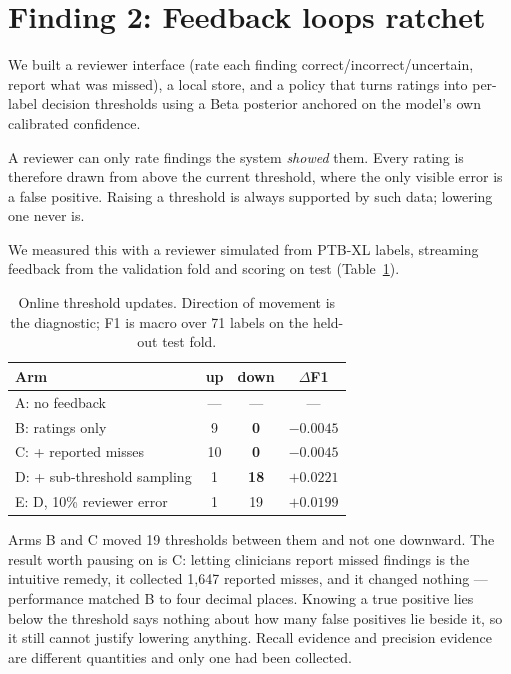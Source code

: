 \documentclass[pmlr,twocolumn,10pt]{jmlr}
\begin{document}
\section{Finding 2: Feedback loops ratchet}
\label{sec:feedback}

We built a reviewer interface (rate each finding correct/incorrect/uncertain, report what was
missed), a local store, and a policy that turns ratings into per-label decision thresholds
using a Beta posterior anchored on the model's own calibrated confidence.

A reviewer can only rate findings the system \emph{showed} them. Every rating is therefore
drawn from above the current threshold, where the only visible error is a false positive.
Raising a threshold is always supported by such data; lowering one never is.

We measured this with a reviewer simulated from PTB-XL labels, streaming feedback from the
validation fold and scoring on test (Table~\ref{tab:feedback}).

\begin{table}[t]
\centering
\caption{Online threshold updates. Direction of movement is the diagnostic; F1 is macro over
71 labels on the held-out test fold.}
\label{tab:feedback}
\begin{tabular}{lccc}
\toprule
Arm & up & down & $\Delta$F1 \\
\midrule
A: no feedback              & --- & --- & --- \\
B: ratings only             & 9  & \textbf{0}  & $-0.0045$ \\
C: + reported misses        & 10 & \textbf{0}  & $-0.0045$ \\
D: + sub-threshold sampling & 1  & \textbf{18} & $\mathbf{+0.0221}$ \\
E: D, 10\% reviewer error   & 1  & 19 & $+0.0199$ \\
\bottomrule
\end{tabular}
\end{table}

Arms B and C moved 19 thresholds between them and not one downward. The result worth
pausing on is C: letting clinicians report missed findings is the intuitive remedy, it
collected 1{,}647 reported misses, and it changed nothing --- performance matched B to four
decimal places. Knowing a true positive lies below the threshold says nothing about how many
false positives lie beside it, so it still cannot justify lowering anything. Recall evidence
and precision evidence are different quantities and only one had been collected.
\end{document}

